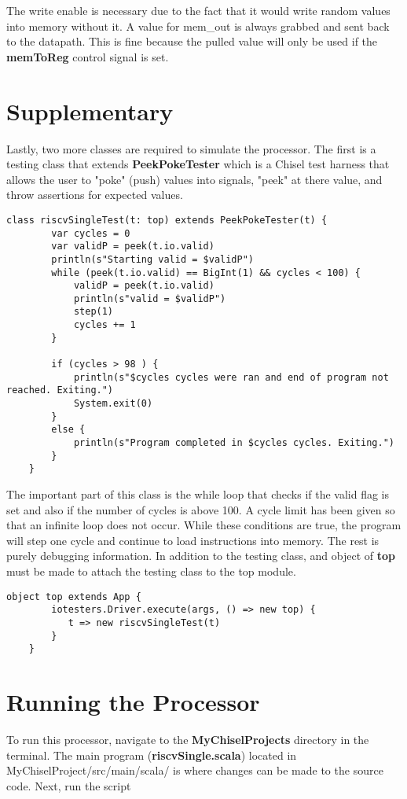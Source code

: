 \documentclass[12pt, letterpaper]{report}
\begin{document}
The write enable is necessary due to the fact that it would write random values into memory without it. 
A value for mem\_out is always grabbed and sent back to the datapath. This is fine because the pulled value will
only be used if the \textbf{memToReg} control signal is set.



\section{Supplementary}
Lastly, two more classes are required to simulate the processor.
The first is a testing class that extends \textbf{PeekPokeTester}
which is a Chisel test harness that allows the user to "poke" (push)
values into signals, "peek" at there value, and throw assertions for
expected values. 

\begin{lstlisting}[style=scala]
	class riscvSingleTest(t: top) extends PeekPokeTester(t) {
		var cycles = 0
		var validP = peek(t.io.valid)
		println(s"Starting valid = $validP")
		while (peek(t.io.valid) == BigInt(1) && cycles < 100) {
			validP = peek(t.io.valid)
			println(s"valid = $validP")
			step(1)
			cycles += 1
		}
		
		if (cycles > 98 ) {
			println(s"$cycles cycles were ran and end of program not reached. Exiting.")
			System.exit(0)
		}
		else {
			println(s"Program completed in $cycles cycles. Exiting.")
		}
	}
\end{lstlisting}

The important part of this class is the while loop that checks if the
valid flag is set and also if the number of cycles is above 100. 
A cycle limit has been given so that an infinite loop does not occur.
While these conditions are true, the program will step one cycle
and continue to load instructions into memory. The rest is purely 
debugging information. In addition to the testing class, and object
of \textbf{top} must be made to attach the testing class to the
top module. 

\begin{lstlisting}[style=scala]
	object top extends App {
		iotesters.Driver.execute(args, () => new top) {
		   t => new riscvSingleTest(t)
		}
	}
\end{lstlisting}
	


\section{Running the Processor}
To run this processor, navigate to the \textbf{MyChiselProjects} directory in the terminal.
The main program (\textbf{riscvSingle.scala}) located in MyChiselProject/src/main/scala/ 
is where changes can be made to the source code.
Next, run the script 
\end{document}
